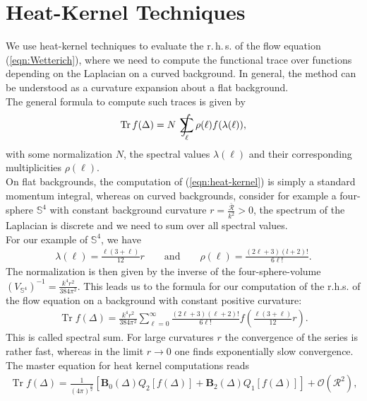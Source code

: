  \section{Heat-Kernel Techniques}\label{sec:heat-kernel}
\vspace{-0.2cm}
We use heat-kernel techniques to evaluate the r.\,h.\,s. of the flow equation (\ref{eqn:Wetterich}), where we need to compute the functional trace over functions depending on the Laplacian on a curved background. In general, the method can be understood as a curvature expansion about a flat background. \\
The general formula to compute such traces is given by
\begin{align}
	\operatorname{Tr} f(\Delta)= N \  \int\kern-1.3em\sum_{\ell} \rho(\ell) f(\lambda(\ell)),
	\label{eqn:heat-kernel}
\end{align}
with some normalization $N$, the spectral values $\lambda(\ell)$ and their corresponding multiplicities $\rho(\ell)$. \\
On flat backgrounds, the computation of (\ref{eqn:heat-kernel}) is simply a standard momentum integral, whereas on curved backgrounds, consider for example a four-sphere $\mathbb{S}^4$ with constant background curvature $r = \frac{\bar{\mathcal{R}}}{k^2} > 0$, the spectrum of the Laplacian is discrete and we need to sum over all spectral values. \\
For our example of $\mathbb{S}^4$, we have
\begin{align}
	\lambda(\ell) = \frac{\ell(3+\ell)}{12}r \qquad \text{and} \qquad \rho(\ell) = \frac{(2\ell + 3)(l+2)!}{6\ell!}.
\end{align}
The normalization is then given by the inverse of the four-sphere-volume $ \left(V_{\mathbb{S}^4}\right)^{-1} = \frac{k^4r^2}{384\pi^2}$. This leads us to the formula for our computation of the r.h.s. of the flow equation on a background with constant positive curvature:
\begin{align}
\operatorname{Tr} f(\Delta)=\frac{k^{4} r^{2}}{384 \pi^{2}} \sum_{\ell=0}^{\infty} \frac{(2 \ell+3)(\ell+2) !}{6 \ell !} f\left(\frac{\ell(3+\ell)}{12} r\right).
\end{align}
This is called spectral sum. For large curvatures $r$ the convergence of the series is rather fast, whereas in the limit $r\rightarrow 0$ one finds exponentially slow convergence.\\
The master equation for heat kernel computations reads
\begin{align}
	\operatorname{Tr} f(\Delta)=\frac{1}{(4 \pi)^{\frac{d}{2}}}\left[\mathbf{B}_{0}(\Delta) Q_{2}[f(\Delta)]+\mathbf{B}_{2}(\Delta) Q_{1}[f(\Delta)]\right]+\mathcal{O}\left(\mathcal{R}^{2}\right),
\label{eqn:master-eqn}
\end{align}
